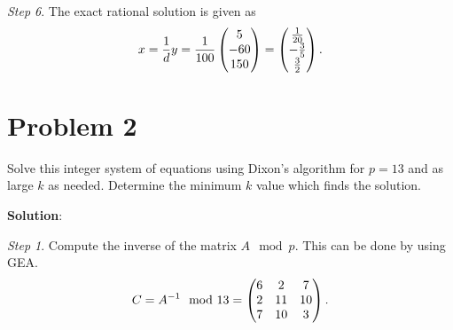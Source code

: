 \documentclass[12pt]{article}
\theoremstyle{plain}
\begin{document}
\emph{Step 6}. The exact rational solution is given as
$$x=\frac{1}{d}y = \frac{1}{100} \begin{pmatrix}5 \\ -60 \\ 150\end{pmatrix} = \begin{pmatrix}\frac{1}{20} \\ -\frac{3}{5} \\ \frac{3}{2}\end{pmatrix}.$$

\section{Problem 2}
Solve this integer system of equations using Dixon’s algorithm for $p = 13$ and as large $k$ as needed. Determine the minimum $k$ value which
finds the solution.

{\bf Solution}:

\emph{Step 1}. Compute the inverse of the matrix $A \mod p$. This can be done by using GEA. 
$$C = A^{-1}\mod 13 = \begin{pmatrix}6 & 2 & 7 \\ 2 & 11 & 10 \\ 7 & 10 & 3\end{pmatrix}.$$
\end{document}

